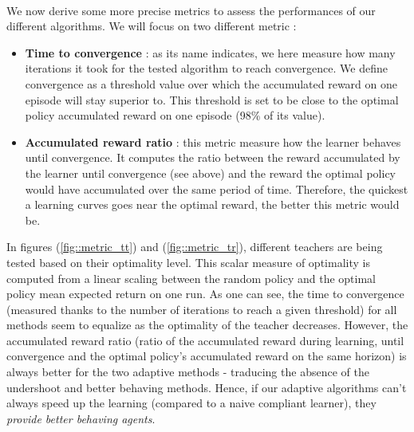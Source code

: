 \documentclass[a4paper]{report}
\begin{document}
{{{{				\paragraph{} We now derive some more precise metrics to assess the performances of our different algorithms. We will focus on two different metric : 
				\begin{itemize}[label=$\cdot$]
					\item \textbf{Time to convergence} : as its name indicates, we here measure how many iterations it took for the tested algorithm to reach convergence. We define convergence as a threshold value over which the accumulated reward on one episode will stay superior to. This threshold is set to be close to the optimal policy accumulated reward on one episode (98\% of its value). 
					\item \textbf{Accumulated reward ratio} : this metric measure how the learner behaves until convergence. It computes the ratio between the reward accumulated by the learner until convergence (see above) and the reward the optimal policy would have accumulated over the same period of time. Therefore, the quickest a learning curves goes near the optimal reward, the better this metric would be. 
				\end{itemize}
				 In figures (\ref{fig::metric_tt}) and (\ref{fig::metric_tr}), different teachers are being tested based on their optimality level. This scalar measure of optimality is computed from a linear scaling between the random policy and the optimal policy mean expected return on one run. As one can see, the time to convergence (measured thanks to the number of iterations to reach a given threshold) for all methods seem to equalize as the optimality of the teacher decreases. However, the accumulated reward ratio (ratio of the accumulated reward during learning, until convergence and the optimal policy's accumulated reward on the same horizon) is always better for the two adaptive methods - traducing the absence of the undershoot and better behaving methods. Hence, if our adaptive algorithms can't always speed up the learning (compared to a naive compliant learner), they \emph{provide better behaving agents}. 
				
}}}}
\end{document}
